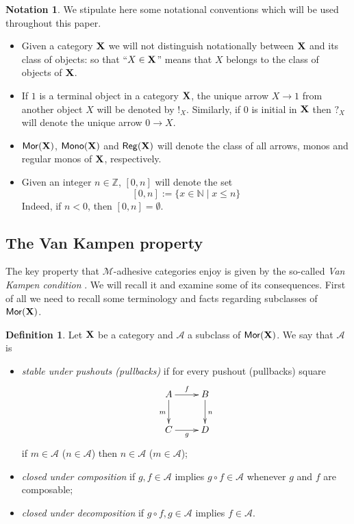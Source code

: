 \documentclass[a4paper]{article}
\newcommand{\mor}{\mathsf{Mor}}
\newcommand{\mon}{\mathsf{Mono}}
\newcommand{\reg}{\mathsf{Reg}}
\def\X{\textbf {\textup{X}}}
\def\Set{\textbf {\textup{Set}}}
\theoremstyle{definition}
\newtheorem{definition}[theorem]{Definition}
\newtheorem*{notation}{Notation}
\begin{document}
\begin{notation} 
We stipulate here some notational conventions which will be used throughout this paper. 
\begin{itemize}\item 
	Given a category $\X$ we will not distinguish notationally between $\X$ and its class of objects: so that ``$X\in \X$'' means that $X$ belongs to the class of objects of $\X$.  
	\item 
	If $1$ is a terminal object in a category $\X$,  the unique arrow $X\to 1$ from another object $X$ will be denoted by $!_X$. Similarly, if $0$ is initial in $\X$ then $?_X$ will denote the unique arrow $0\to X$. %
	\item  $\mor(\X)$, $\mon(\X)$ and $\reg(\X)$ will denote the class of all arrows, monos and regular monos of $\X$, respectively.
	
	\item Given an integer $n\in \mathbb{Z}$, $[0,n]$ will denote the set
	\[[0,n]:=\{x\in \mathbb{N}\mid x\leq n\}\] 
	Indeed, if $n<0$, then $[0,n]=\emptyset$.
\end{itemize}
\end{notation}


\subsection{The Van Kampen property}
The key property that $\mathcal{M}$-adhesive categories enjoy is given by  the so-called \emph{Van Kampen condition} \cite{brown1997van,johnstone2007quasitoposes,lack2005adhesive}. We will recall it and examine some of its consequences. First of all we need to recall some terminology and facts regarding subclasses of $\mor(\X)$.

\begin{definition}
	Let $\X$ be a category and $\mathcal{A}$ a  subclass of $\mor(\X)$. We say that  $\mathcal{A}$ is
	\begin{itemize}
		\item 
		\emph{stable under pushouts (pullbacks)} if for every pushout (pullbacks) square 
		\[\xymatrix{A\ar[r]^f  \ar[d]_{m}& B \ar[d]^n \\ C \ar[r]_g & D}\]
		if $m \in \mathcal{A}$ ($n\in \mathcal{A}$) then $n \in \mathcal{A}$ ($m \in \mathcal{A}$);
		\item \emph{closed under composition} if $g, f\in \mathcal{A}$ implies $g\circ f\in \mathcal{A}$ whenever $g$ and $f$ are composable;
		\item \emph{closed under decomposition} if $g\circ f, g\in \mathcal{A}$ implies $f\in \mathcal{A}$.
	\end{itemize}
\end{definition}
\end{document}
